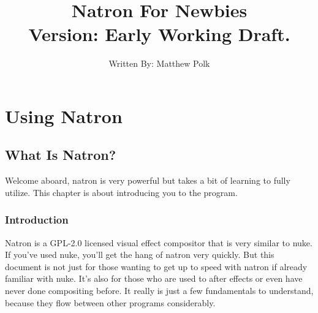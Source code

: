 \documentclass[letterpaper,12pt,oneside]{book}
\title{Natron For Newbies\\Version: Early Working Draft.}
\author{Written By: Matthew Polk}
\date{}
\begin{document}
\renewcommand{\contentsname}{Table of Contents}
\frontmatter
\hypersetup{pageanchor=false}
\maketitle
\hypersetup{pageanchor=true}

\tableofcontents
\cleardoublepage


\mainmatter


\part{Using Natron}

\chapter{What Is Natron?}
Welcome aboard, natron is very powerful but takes a bit of learning to
fully utilize. This chapter is about introducing you to the program.

\bigbreak
\section{Introduction}
Natron is a GPL-2.0 licensed visual effect compositor that is very similar to nuke. If you've used nuke, you'll get the hang of natron very quickly. But this document is not just for those wanting to get up to speed with natron if already familiar with nuke. It's also for those who are used to after effects or even have never done compositing before. It really is just a few fundamentals to understand, because they flow between other programs considerably.
\newpage
\end{document}
